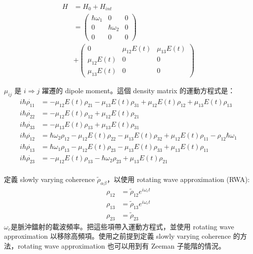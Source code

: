 \documentclass[11pt,a4paper]{article}
\begin{document}
\begin{align}
H &= H_0+H_{int}\nonumber \\
&=
\left(
\begin{array}{ccc}
\hbar \omega_1 & 0&0\\
0& \hbar \omega_{2}&0\\
0&0&0
\end{array}
\right)\nonumber\\  &+
\left(
\begin{array}{ccc}
0& \mu_{12} E(t)&\mu_{13}E(t)\\
\mu_{12}E(t) &0&0\\
\mu_{13}E(t)&0&0
\end{array}
\right)
\end{align}

$\mu_{ij}$ 是 $i\Rightarrow j$ 躍遷的 dipole moment。這個 density matrix 的運動方程式是：\\
\begin{align}
\label{eq:timeevo3}
i \hbar \dot{\rho_{11}} &= -\mu_{12}E(t)\rho_{21}-\mu_{13}E(t)\rho_{31}+\mu_{12}E(t)\rho_{12}+\mu_{13}E(t)\rho_{13}\nonumber\\
i \hbar \dot{\rho_{22}} &= -\mu_{12}E(t)\rho_{12}+\mu_{12}E(t)\rho_{21}\nonumber\\
i \hbar \dot{\rho_{33}} &= -\mu_{13}E(t)\rho_{13}+\mu_{13}E(t)\rho_{31}\nonumber\\
i \hbar \dot{\rho_{12}} &= \hbar\omega_{2}\rho_{12}-\mu_{12}E(t)\rho_{22}-\mu_{13}E(t)\rho_{32}+\mu_{12}E(t)\rho_{11}-\rho_{12}\hbar\omega_{1}\nonumber\\
i \hbar \dot{\rho_{13}} &= \hbar\omega_1\rho_{13}-\mu_{12}E(t)\rho_{23}-\mu_{13}E(t)\rho_{33}+\mu_{13}E(t)\rho_{11}\nonumber\\
i \hbar \dot{\rho_{23}} &= -\mu_{12}E(t)\rho_{13}-\hbar\omega_{2}\rho_{23}+\mu_{13}E(t)\rho_{21}\nonumber\\
\end{align}

定義 slowly varying coherence $\tilde{\rho}_{\alpha\beta}$，以使用 rotating wave approximation (RWA):\\
\begin{align*}
\rho_{12} &= \tilde{\rho}_{12}e^{i\omega_c t}\\
\rho_{13} &= \tilde{\rho}_{13}e^{i\omega_c t}\\
\rho_{23} &= \tilde{\rho}_{23}
\end{align*}
$\omega_c$是脈沖鐳射的載波頻率。把這些項帶入運動方程式，並使用 rotating wave approximation 以移除高頻項。使用之前提到定義 slowly varying coherence 的方法，rotating wave approximation 也可以用到有 Zeeman 子能階的情況。\\
\end{document}
